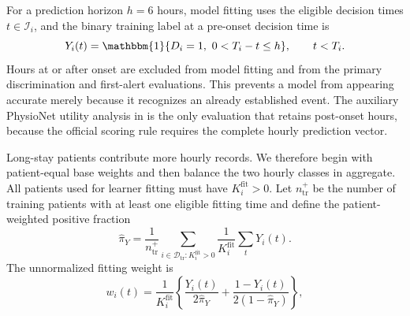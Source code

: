 \documentclass[11pt]{article}
\newcommand{\Ind}{\mathbbm{1}}
\newcommand{\calD}{\mathcal{D}}
\newcommand{\calI}{\mathcal{I}}
\begin{document}
For a prediction horizon $h=6$ hours, model fitting uses the eligible decision times $t\in\calI_i$, and the binary training label at a pre-onset decision time is
\begin{equation}
Y_i(t)=\Ind\{D_i=1,\ 0<T_i-t\le h\},
\qquad t<T_i.
\label{eq:hour-label}
\end{equation}
Hours at or after onset are excluded from model fitting and from the primary discrimination and first-alert evaluations. This prevents a model from appearing accurate merely because it recognizes an already established event. The auxiliary PhysioNet utility analysis in  is the only evaluation that retains post-onset hours, because the official scoring rule requires the complete hourly prediction vector.

Long-stay patients contribute more hourly records. We therefore begin with patient-equal base weights and then balance the two hourly classes in aggregate. All patients used for learner fitting must have $K_i^{\mathrm{fit}}>0$. Let $n_{\mathrm{tr}}^{+}$ be the number of training patients with at least one eligible fitting time and define the patient-weighted positive fraction
\begin{equation}
\widehat\pi_Y=
\frac{1}{n_{\mathrm{tr}}^{+}}
\sum_{i\in\calD_{\mathrm{tr}}:K_i^{\mathrm{fit}}>0}
\frac{1}{K_i^{\mathrm{fit}}}
\sum_{t}Y_i(t).
\label{eq:weighted-prevalence}
\end{equation}
The unnormalized fitting weight is
\begin{equation}
w_i(t)=\frac{1}{K_i^{\mathrm{fit}}}
\left\{
\frac{Y_i(t)}{2\widehat\pi_Y}
+\frac{1-Y_i(t)}{2(1-\widehat\pi_Y)}
\right\},
\label{eq:patient-weight}
\end{equation}
\end{document}
